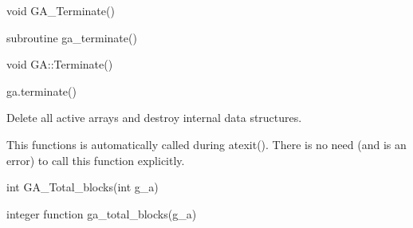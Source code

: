 \documentclass[12pt]{article}
\begin{document}
\begin{capi}
\begin{ccode}
void GA_Terminate()
\end{ccode}
\end{capi}

\begin{fapi}
\begin{fcode}
subroutine ga_terminate()
\end{fcode}
\end{fapi}

\begin{cxxapi}
\begin{cxxcode}
void GA::Terminate()
\end{cxxcode}
\end{cxxapi}

\begin{pyapi}
\begin{pycode}
ga.terminate()
\end{pycode}
\end{pyapi}

\wcoll

\begin{desc}

Delete all active arrays and destroy internal data structures.

\end{desc}

\begin{pydesc}

This functions is automatically called during atexit(). There is no need (and
is an error) to call this function explicitly.

\end{pydesc}


\begin{capi}
\begin{ccode}
int GA_Total_blocks(int g_a)
\end{ccode}
\begin{funcargs}
\end{funcargs}
\end{capi}

\begin{fapi}
\begin{fcode}
integer function ga_total_blocks(g_a)
\end{fcode}
\begin{funcargs}
\end{funcargs}
\end{fapi}
\end{document}
